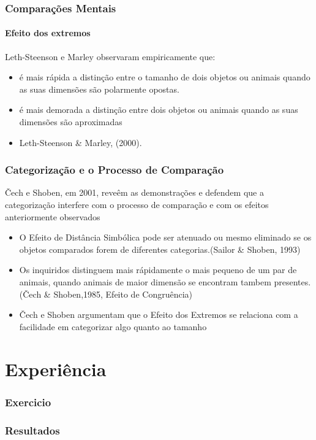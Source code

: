 \documentclass{beamer}
\begin{document}
\begin{frame}
	\frametitle{Comparações Mentais}
	\framesubtitle{Efeito dos extremos}

	Leth-Steenson e Marley observaram empiricamente que:
	\begin{itemize}
		\item é mais rápida a distinção entre o tamanho de dois objetos ou animais quando as suas dimensões são polarmente opostas.
		\item é mais demorada a distinção entre dois objetos ou animais quando as suas dimensões são aproximadas
		\item Leth-Steenson \& Marley, (2000).
	\end{itemize}
\end{frame}
\begin{frame}
	\frametitle{Categorização e o Processo de Comparação}
	Čech e Shoben, em 2001, reveêm as demonstrações e defendem que a categorização interfere com o processo de comparação e com os efeitos anteriormente observados
	
	\begin{itemize}
		\item O Efeito de Distância Simbólica pode ser atenuado ou mesmo eliminado se os objetos comparados forem de diferentes categorias.(Sailor \& Shoben, 1993)
		\item Os inquiridos distinguem mais rápidamente o mais pequeno de um par de animais, quando animais de maior dimensão se encontram tambem presentes. (Čech \& Shoben,1985, Efeito de Congruência)
		\item Čech e Shoben argumentam que o Efeito dos Extremos se relaciona com a facilidade em categorizar algo quanto ao tamanho  		
	\end{itemize} 
\end{frame}
\section{Experiência}
\begin{frame}
	\frametitle{Exercicio}
\end{frame}
\begin{frame}
	\frametitle{Resultados}
\end{frame}
\end{document}

